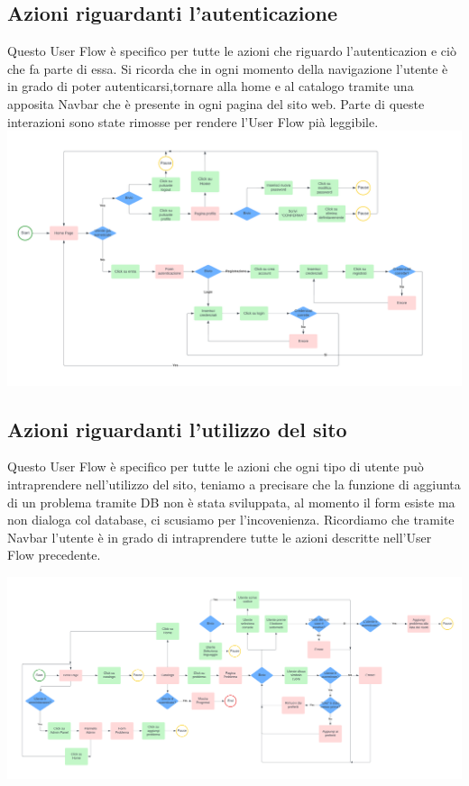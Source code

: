 \documentclass[11pt, a4paper]{article}
\theoremstyle{definition}
\begin{document}
\subsection{Azioni riguardanti l'autenticazione}
Questo User Flow è specifico per tutte le azioni che riguardo l'autenticazion e ciò che fa parte di essa. Si ricorda che in ogni momento della navigazione
l'utente è in grado di poter autenticarsi,tornare alla home e al catalogo tramite una apposita Navbar che è presente in ogni pagina del sito web. Parte di queste interazioni sono state rimosse per
rendere l'User Flow pià leggibile.
  \includegraphics[width=\textwidth]{materiale/UserFlow Autenticazione.png}
\newpage
\subsection{Azioni riguardanti l'utilizzo del sito}
Questo User Flow è specifico per tutte le azioni che ogni tipo di utente può intraprendere nell'utilizzo del sito, teniamo a precisare che la funzione di aggiunta di un problema tramite DB non è stata sviluppata, al momento il form esiste
ma non dialoga col database, ci scusiamo per l'incovenienza. Ricordiamo che tramite Navbar l'utente è in grado di intraprendere tutte le azioni descritte nell'User Flow precedente.

  \includegraphics[width=\textwidth]{materiale/UserFlow Utilizzo.png}
\end{document}
